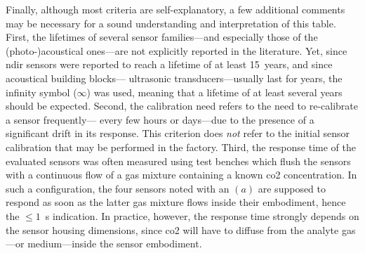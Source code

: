 Finally, although most criteria are self-explanatory, a few additional comments may be necessary for a sound understanding and interpretation of this table. First, the lifetimes of several sensor families---and especially those of the (photo-)acoustical ones---are not explicitly reported in the literature. Yet, since \gls{ndir} sensors were reported to reach a lifetime of at least 15~years\cite{gibson2013}, and since acoustical building blocks---\eg{} ultrasonic transducers---usually last for years, the infinity symbol ($\infty$) was used, meaning that a lifetime of at least several years should be expected. Second, the calibration need refers to the need to re-calibrate a sensor frequently---\ie{} every few hours or days---due to the presence of a significant drift in its response. This criterion does \emph{not} refer to the initial sensor calibration that may be performed in the factory. Third, the response time of the evaluated sensors was often measured using test benches which flush the sensors with a continuous flow of a gas mixture containing a known \gls{co2} concentration. In such a configuration, the four sensors noted with an $(a)$ are supposed to respond as soon as the latter gas mixture flows inside their embodiment, hence the $\leq 1$~s indication. In practice, however, the response time strongly depends on the sensor housing dimensions, since \gls{co2} will have to diffuse from the analyte gas---or medium---inside the sensor embodiment.

